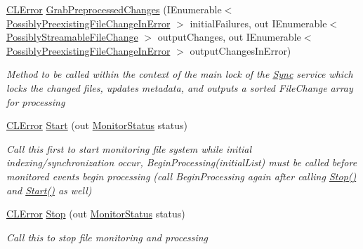 \begin{DoxyCompactItemize}
\item 
\hyperlink{class_cloud_api_public_1_1_model_1_1_c_l_error}{C\-L\-Error} \hyperlink{class_cloud_api_public_1_1_file_monitor_1_1_monitor_agent_abf4b1ccaee3f8fe5c2a24a195a6c2f69}{Grab\-Preprocessed\-Changes} (I\-Enumerable$<$ \hyperlink{struct_cloud_api_public_1_1_model_1_1_possibly_preexisting_file_change_in_error}{Possibly\-Preexisting\-File\-Change\-In\-Error} $>$ initial\-Failures, out I\-Enumerable$<$ \hyperlink{struct_cloud_api_public_1_1_model_1_1_possibly_streamable_file_change}{Possibly\-Streamable\-File\-Change} $>$ output\-Changes, out I\-Enumerable$<$ \hyperlink{struct_cloud_api_public_1_1_model_1_1_possibly_preexisting_file_change_in_error}{Possibly\-Preexisting\-File\-Change\-In\-Error} $>$ output\-Changes\-In\-Error)
\begin{DoxyCompactList}\small\item\em Method to be called within the context of the main lock of the \hyperlink{namespace_cloud_api_public_1_1_sync}{Sync} service which locks the changed files, updates metadata, and outputs a sorted File\-Change array for processing \end{DoxyCompactList}\item 
\hyperlink{class_cloud_api_public_1_1_model_1_1_c_l_error}{C\-L\-Error} \hyperlink{class_cloud_api_public_1_1_file_monitor_1_1_monitor_agent_a7fd0bcb1837d5a27a32385232f6f463b}{Start} (out \hyperlink{namespace_cloud_api_public_1_1_static_a31db95951688473984962a22ad05a45f}{Monitor\-Status} status)
\begin{DoxyCompactList}\small\item\em Call this first to start monitoring file system while initial indexing/synchronization occur, Begin\-Processing(initial\-List) must be called before monitored events begin processing (call Begin\-Processing again after calling \hyperlink{class_cloud_api_public_1_1_file_monitor_1_1_monitor_agent_ae9123602c7ba50f698e71b6904ba8cb6}{Stop()} and \hyperlink{class_cloud_api_public_1_1_file_monitor_1_1_monitor_agent_a7fd0bcb1837d5a27a32385232f6f463b}{Start()} as well) \end{DoxyCompactList}\item 
\hyperlink{class_cloud_api_public_1_1_model_1_1_c_l_error}{C\-L\-Error} \hyperlink{class_cloud_api_public_1_1_file_monitor_1_1_monitor_agent_ae9123602c7ba50f698e71b6904ba8cb6}{Stop} (out \hyperlink{namespace_cloud_api_public_1_1_static_a31db95951688473984962a22ad05a45f}{Monitor\-Status} status)
\begin{DoxyCompactList}\small\item\em Call this to stop file monitoring and processing \end{DoxyCompactList}\item 

\end{DoxyCompactItemize}
